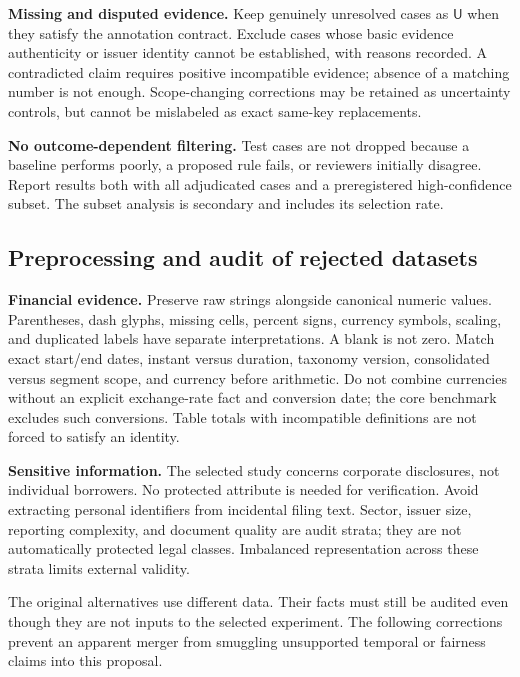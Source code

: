 \documentclass[11pt,a4paper]{article}
\newcommand{\pbreak}{\clearpage}
\newcommand{\lead}[1]{\textbf{\color{navy}#1}}
\newcommand{\Ulabel}{\mathsf{U}}
\begin{document}
\lead{Missing and disputed evidence.} Keep genuinely unresolved cases as $\Ulabel$ when they satisfy the annotation contract. Exclude cases whose basic evidence authenticity or issuer identity cannot be established, with reasons recorded. A contradicted claim requires positive incompatible evidence; absence of a matching number is not enough. Scope-changing corrections may be retained as uncertainty controls, but cannot be mislabeled as exact same-key replacements.

\lead{No outcome-dependent filtering.} Test cases are not dropped because a baseline performs poorly, a proposed rule fails, or reviewers initially disagree. Report results both with all adjudicated cases and a preregistered high-confidence subset. The subset analysis is secondary and includes its selection rate.

\pbreak
\subsection{Preprocessing and audit of rejected datasets}
\lead{Financial evidence.} Preserve raw strings alongside canonical numeric values. Parentheses, dash glyphs, missing cells, percent signs, currency symbols, scaling, and duplicated labels have separate interpretations. A blank is not zero. Match exact start/end dates, instant versus duration, taxonomy version, consolidated versus segment scope, and currency before arithmetic. Do not combine currencies without an explicit exchange-rate fact and conversion date; the core benchmark excludes such conversions. Table totals with incompatible definitions are not forced to satisfy an identity.

\lead{Sensitive information.} The selected study concerns corporate disclosures, not individual borrowers. No protected attribute is needed for verification. Avoid extracting personal identifiers from incidental filing text. Sector, issuer size, reporting complexity, and document quality are audit strata; they are not automatically protected legal classes. Imbalanced representation across these strata limits external validity.

The original alternatives use different data. Their facts must still be audited even though they are not inputs to the selected experiment. The following corrections prevent an apparent merger from smuggling unsupported temporal or fairness claims into this proposal.
\end{document}
